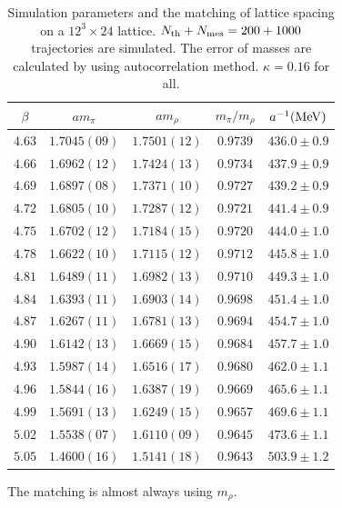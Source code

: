 \begin{table}[!htbp]
\begin{center}
\begin{tabular}{ccccc}
\hline
$\beta$ & $am_{\pi}$ & $am_{\rho}$ & $m_{\pi}/m_{\rho}$ & $a^{-1}({\rm MeV})$ \\
\hline
$4.63$ & $1.7045(09)$ & $1.7501(12)$  & $0.9739$ & $436.0\pm 0.9$ \\
$4.66$ & $1.6962(12)$ & $1.7424(13)$  & $0.9734$ & $437.9\pm 0.9$ \\
$4.69$ & $1.6897(08)$ & $1.7371(10)$  & $0.9727$ & $439.2\pm 0.9$ \\
$4.72$ & $1.6805(10)$ & $1.7287(12)$  & $0.9721$ & $441.4\pm 0.9$ \\
$4.75$ & $1.6702(12)$ & $1.7184(15)$  & $0.9720$ & $444.0\pm 1.0$ \\
$4.78$ & $1.6622(10)$ & $1.7115(12)$  & $0.9712$ & $445.8\pm 1.0$ \\
$4.81$ & $1.6489(11)$ & $1.6982(13)$  & $0.9710$ & $449.3\pm 1.0$ \\
$4.84$ & $1.6393(11)$ & $1.6903(14)$  & $0.9698$ & $451.4\pm 1.0$ \\
$4.87$ & $1.6267(11)$ & $1.6781(13)$  & $0.9694$ & $454.7\pm 1.0$ \\
$4.90$ & $1.6142(13)$ & $1.6669(15)$  & $0.9684$ & $457.7\pm 1.0$ \\
$4.93$ & $1.5987(14)$ & $1.6516(17)$  & $0.9680$ & $462.0\pm 1.1$ \\
$4.96$ & $1.5844(16)$ & $1.6387(19)$  & $0.9669$ & $465.6\pm 1.1$ \\
$4.99$ & $1.5691(13)$ & $1.6249(15)$  & $0.9657$ & $469.6\pm 1.1$ \\
$5.02$ & $1.5538(07)$ & $1.6110(09)$  & $0.9645$ & $473.6\pm 1.1$ \\
$5.05$ & $1.4600(16)$ & $1.5141(18)$  & $0.9643$ & $503.9\pm 1.2$ \\
\hline
\end{tabular}
\end{center}
\caption{\label{tab:matchingwd2}Simulation parameters and the matching of lattice spacing on a $12^3\times 24$ lattice. $N_{\rm th}+N_{\rm mes}=200+1000$ trajectories are simulated. The error of masses are calculated by using autocorrelation method. $\kappa=0.16$ for all.}
\end{table}

The matching is almost always using $m_{\rho}$.